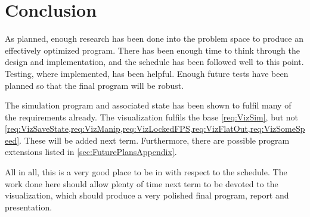 
\chapter{Conclusion}
\label{sec:Conclusion} 
As planned, enough research has been done into the problem space to produce an effectively optimized program.
There has been enough time to think through the design and implementation, and the schedule has been followed well to this point.
Testing, where implemented, has been helpful.
Enough future tests have been planned so that the final program will be robust.

The simulation program and associated state has been shown to fulfil many of the requirements already.
The visualization fulfils the base \cref{req:VizSim}, but not \cref{req:VizSaveState,req:VizManip,req:VizLockedFPS,req:VizFlatOut,req:VizSomeSpeed}.
These will be added next term.
Furthermore, there are possible program extensions listed in \cref{sec:FuturePlansAppendix}.

All in all, this is a very good place to be in with respect to the schedule.
The work done here should allow plenty of time next term to be devoted to the visualization, which should produce a very polished final program, report and presentation.

